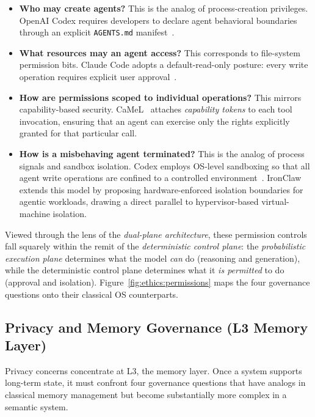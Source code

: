 \begin{itemize}[nosep]
\item \textbf{Who may create agents?}  This is the analog of process-creation privileges.  OpenAI Codex requires developers to declare agent behavioral boundaries through an explicit \texttt{AGENTS.md} manifest~\cite{openai_codex_agents_md_2026}.
\item \textbf{What resources may an agent access?}  This corresponds to file-system permission bits.  Claude Code adopts a default-read-only posture: every write operation requires explicit user approval~\cite{anthropic_claudecode_security_2026}.
\item \textbf{How are permissions scoped to individual operations?}  This mirrors capability-based security.  CaMeL~\cite{debenedetti2025camel} attaches \emph{capability tokens} to each tool invocation, ensuring that an agent can exercise only the rights explicitly granted for that particular call.
\item \textbf{How is a misbehaving agent terminated?}  This is the analog of process signals and sandbox isolation.  Codex employs OS-level sandboxing so that all agent write operations are confined to a controlled environment~\cite{openai_codex_sandbox_2026}.  IronClaw~\cite{ironclaw2025} extends this model by proposing hardware-enforced isolation boundaries for agentic workloads, drawing a direct parallel to hypervisor-based virtual-machine isolation.
\end{itemize}

Viewed through the lens of the \emph{dual-plane architecture}, these permission controls fall squarely within the remit of the \emph{deterministic control plane}: the \emph{probabilistic execution plane} determines what the model \emph{can} do (reasoning and generation), while the deterministic control plane determines what it \emph{is permitted} to do (approval and isolation).
Figure~\ref{fig:ethics:permissions} maps the four governance questions onto their classical OS counterparts.


\subsection{Privacy and Memory Governance (L3 Memory Layer)}
\label{sec:ethics-privacy}

Privacy concerns concentrate at L3, the memory layer.  Once a system supports long-term state, it must confront four governance questions that have analogs in classical memory management but become substantially more complex in a semantic system.


